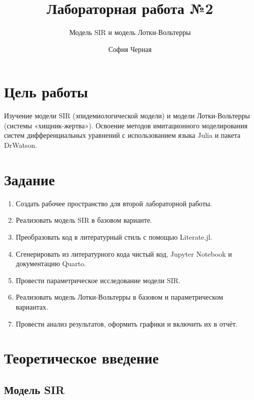\documentclass[
  12pt,
  a4paper,
  DIV=11,
  numbers=noendperiod]{scrreprt}
\title{Лабораторная работа №2}
\subtitle{Модель SIR и модель Лотки-Вольтерры}
\author{София Черная}
\date{}
\providecommand{\tightlist}{%
  \setlength{\itemsep}{0pt}\setlength{\parskip}{0pt}}\usepackage{longtable,booktabs,array}
\renewcommand*\contentsname{Содержание}
\newcommand\contentsname{Содержание}
\begin{document}
\maketitle

\renewcommand*\contentsname{Содержание}
{
\setcounter{tocdepth}{1}
\tableofcontents
}
\listoffigures
\listoftables

\chapter{Цель
работы}\label{ux446ux435ux43bux44c-ux440ux430ux431ux43eux442ux44b}

Изучение модели SIR (эпидемиологической модели) и модели Лотки-Вольтерры
(системы «хищник-жертва»). Освоение методов имитационного моделирования
систем дифференциальных уравнений с использованием языка Julia и пакета
DrWatson.

\chapter{Задание}\label{ux437ux430ux434ux430ux43dux438ux435}

\begin{enumerate}
\def\labelenumi{\arabic{enumi}.}
\tightlist
\item
  Создать рабочее пространство для второй лабораторной работы.
\item
  Реализовать модель SIR в базовом варианте.
\item
  Преобразовать код в литературный стиль с помощью Literate.jl.
\item
  Сгенерировать из литературного кода чистый код, Jupyter Notebook и
  документацию Quarto.
\item
  Провести параметрическое исследование модели SIR.
\item
  Реализовать модель Лотки-Вольтерры в базовом и параметрическом
  вариантах.
\item
  Провести анализ результатов, оформить графики и включить их в отчёт.
\end{enumerate}

\chapter{Теоретическое
введение}\label{ux442ux435ux43eux440ux435ux442ux438ux447ux435ux441ux43aux43eux435-ux432ux432ux435ux434ux435ux43dux438ux435}

\section{Модель SIR}\label{ux43cux43eux434ux435ux43bux44c-sir}
\end{document}
